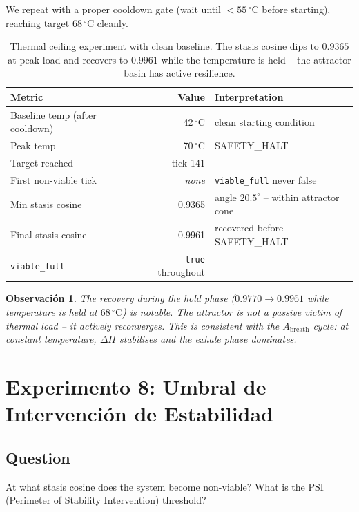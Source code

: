 \documentclass[11pt, a4paper]{article}
\newtheorem{remark}{Observación}
\begin{document}
We repeat with a proper cooldown gate (wait until $< 55\,^\circ\mathrm{C}$
before starting), reaching target $68\,^\circ\mathrm{C}$ cleanly.

\begin{table}[h]
\centering
\begin{tabular}{lrl}
\toprule
Metric & Value & Interpretation \\
\midrule
Baseline temp (after cooldown) & 42\,$^\circ$C & clean starting condition \\
Peak temp & 70\,$^\circ$C & SAFETY\_HALT \\
Target reached & tick 141 & \\
First non-viable tick & \textit{none} & \texttt{viable\_full} never false \\
Min stasis cosine & 0.9365 & angle $20.5^\circ$ -- within attractor cone \\
Final stasis cosine & 0.9961 & recovered before SAFETY\_HALT \\
\texttt{viable\_full} & \texttt{true} throughout & \\
\bottomrule
\end{tabular}
\caption{Thermal ceiling experiment with clean baseline.
The stasis cosine dips to $0.9365$ at peak load and recovers to $0.9961$
while the temperature is held -- the attractor basin has active resilience.}
\label{tab:ceiling}
\end{table}

\begin{remark}
The recovery during the hold phase ($0.9770 \to 0.9961$ while temperature
is held at $68\,^\circ\mathrm{C}$) is notable.
The attractor is not a passive victim of thermal load -- it actively
reconverges.
This is consistent with the $A_\text{breath}$ cycle: at constant temperature,
$\Delta H$ stabilises and the exhale phase dominates.
\end{remark}


\section{Experimento 8: Umbral de Intervención de Estabilidad}
\label{sec:psi}

\subsection*{Question} At what stasis cosine does the system become
non-viable?
What is the PSI (Perimeter of Stability Intervention) threshold?
\end{document}
